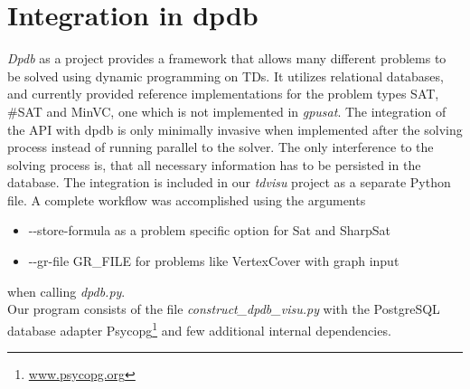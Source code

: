 \documentclass[a4paper, 12pt, bibliography=totoc]{scrartcl}
\begin{document}
\section{Integration in dpdb}\label{sec:dpdb}
\textit{Dpdb} as a project provides a framework that allows many different problems to be solved using dynamic programming on TDs. It utilizes relational databases, and currently provided reference implementations for the problem types SAT, \#SAT and MinVC, one which is not implemented in \textit{gpusat}.
The integration of the API with dpdb is only minimally invasive when implemented after the solving process instead of running parallel to the solver. 
The only interference to the solving process is, that all necessary information has to be persisted in the database.
The integration is included in our \textit{tdvisu} project as a separate Python file.
A complete workflow was accomplished using the arguments
\begin{itemize}
	\item -{}-store-formula as a problem specific option for Sat and SharpSat
	\item -{}-gr-file GR\_FILE for problems like VertexCover with graph input 
\end{itemize}
when calling \textit{dpdb.py}.\\
Our program consists of the file \textit{construct\_dpdb\_visu.py} with the PostgreSQL database adapter Psycopg\footnote{\url{www.psycopg.org}} and few additional internal dependencies.
\end{document}

